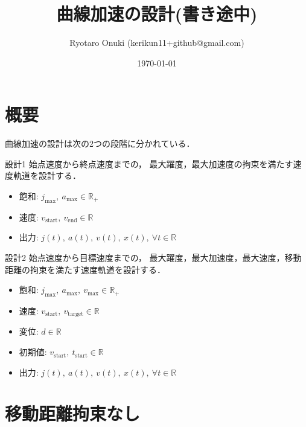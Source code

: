 \documentclass[a5paper]{ltjsarticle}
\title{曲線加速の設計(書き途中)}
\author{Ryotaro Onuki (kerikun11+github@gmail.com)}
\date{\today}
\begin{document}
\maketitle
\section{概要}
曲線加速の設計は次の2つの段階に分かれている．
\begin{itembox}[l]{設計1}
    \quad
    始点速度から終点速度までの，
    最大躍度，最大加速度の拘束を満たす速度軌道を設計する．
    \begin{itemize}
        \item 飽和: $j_{\max},~ a_{\max} \in \mathbb{R}_+$
        \item 速度: $v_\mathrm{start},~ v_\mathrm{end} \in \mathbb{R}$
        \item 出力: $j(t),~ a(t),~ v(t),~ x(t),~ \forall t \in \mathbb{R}$
    \end{itemize}
\end{itembox}
\begin{itembox}[l]{設計2}
    \quad
    始点速度から目標速度までの，
    最大躍度，最大加速度，最大速度，移動距離の拘束を満たす速度軌道を設計する．
    \begin{itemize}
        \item 飽和: $j_{\max},~ a_{\max},~ v_{\max} \in \mathbb{R}_+$
        \item 速度: $v_\mathrm{start},~ v_\mathrm{target} \in \mathbb{R}$
        \item 変位: $d \in \mathbb{R}$
        \item 初期値: $v_\mathrm{start},~ t_\mathrm{start} \in \mathbb{R}$
        \item 出力: $j(t),~ a(t),~ v(t),~ x(t),~ \forall t \in \mathbb{R}$
    \end{itemize}
\end{itembox}
\section{移動距離拘束なし}
\end{document}
